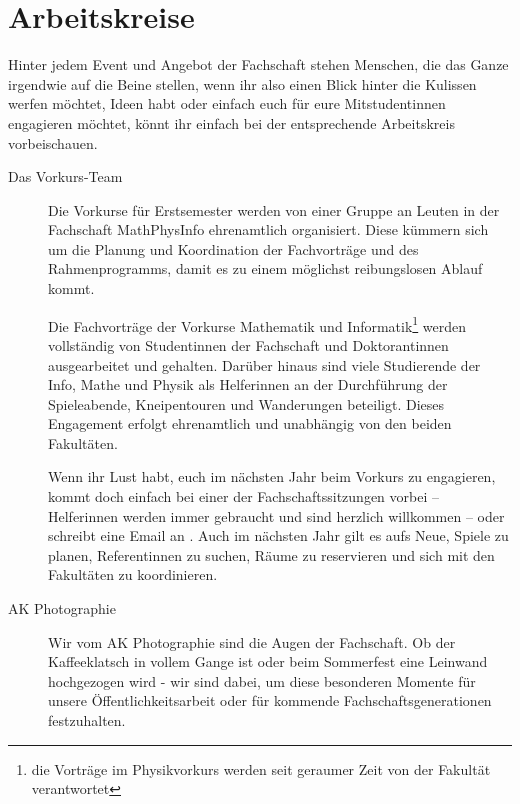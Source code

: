 \vspace{-3mm}

\section{Arbeitskreise}
\label{AKs}
\vspace{-1mm}

Hinter jedem Event und Angebot der Fachschaft stehen Menschen, die das Ganze irgendwie auf die Beine stellen, wenn ihr also einen Blick hinter die Kulissen werfen möchtet, Ideen habt oder einfach euch für eure Mitstudentinnen engagieren möchtet, könnt ihr einfach bei der entsprechende Arbeitskreis vorbeischauen.


\begin{description}
	\item[Das Vorkurs-Team]
	
	Die Vorkurse für Erstsemester werden von einer Gruppe an Leuten in der Fachschaft MathPhysInfo ehrenamtlich organisiert. Diese kümmern sich um die Planung und Koordination der Fachvorträge und des Rahmenprogramms, damit es zu einem möglichst reibungslosen Ablauf kommt.
	
	Die Fachvorträge der Vorkurse Mathematik und Informatik\footnote{die Vorträge im Physikvorkurs werden seit geraumer Zeit von der Fakultät verantwortet} werden vollständig von Studentinnen der Fachschaft und Doktorantinnen ausgearbeitet und gehalten. Darüber hinaus sind viele Studierende der Info, Mathe und Physik als Helferinnen an der Durchführung der Spieleabende, Kneipentouren und Wanderungen beteiligt. Dieses Engagement erfolgt ehrenamtlich und unabhängig von den beiden Fakultäten. 
	
	
	Wenn ihr Lust habt, euch im nächsten Jahr beim Vorkurs zu engagieren, kommt doch einfach bei einer der Fachschaftssitzungen vorbei -- Helferinnen werden immer gebraucht und sind herzlich willkommen -- oder schreibt eine Email an . Auch im nächsten Jahr gilt es aufs Neue, Spiele zu planen, Referentinnen zu suchen, Räume zu reservieren und sich mit den Fakultäten zu koordinieren.
	
      \item[AK Photographie]
        Wir vom AK Photographie sind die Augen der Fachschaft. Ob der Kaffeeklatsch in vollem Gange ist oder beim Sommerfest eine Leinwand hochgezogen wird - wir sind dabei, um diese besonderen Momente für unsere Öffentlichkeitsarbeit oder für kommende Fachschaftsgenerationen festzuhalten.


\end{description}
